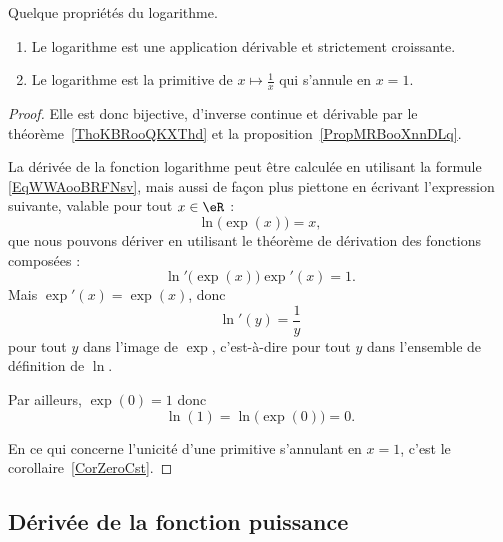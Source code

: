 \begin{proposition}\label{ExZLMooMzYqfK}
    Quelque propriétés du logarithme.
    \begin{enumerate}
        \item
            Le logarithme est une application dérivable et strictement croissante.
        \item
            Le logarithme est la primitive de \( x\mapsto\frac{1}{ x }\) qui s'annule en \( x=1\).
    \end{enumerate}
\end{proposition}

\begin{proof}
    Elle est donc bijective, d'inverse continue et dérivable par le théorème~\ref{ThoKBRooQKXThd} et la proposition~\ref{PropMRBooXnnDLq}.

    La dérivée de la fonction logarithme peut être calculée en utilisant la formule \eqref{EqWWAooBRFNsv}, mais aussi de façon plus piettone en écrivant l'expression suivante, valable pour tout \( x\in \eR\) :
    \begin{equation}
        \ln\big( \exp(x) \big)=x,
    \end{equation}
    que nous pouvons dériver en utilisant le théorème de dérivation des fonctions composées :
    \begin{equation}
        \ln'\big( \exp(x) \big)\exp'(x)=1.
    \end{equation}
    Mais \( \exp'(x)=\exp(x)\), donc
    \begin{equation}
        \ln'(y)=\frac{1}{ y }
    \end{equation}
    pour tout \( y\) dans l'image de \( \exp\), c'est-à-dire pour tout \( y\) dans l'ensemble de définition de \( \ln\).

    Par ailleurs, \( \exp(0)=1\) donc
    \begin{equation}
        \ln(1)=\ln\big( \exp(0) \big)=0.
    \end{equation}

    En ce qui concerne l'unicité d'une primitive s'annulant en \( x=1\), c'est le corollaire~\ref{CorZeroCst}.
\end{proof}

\subsection{Dérivée de la fonction puissance}

